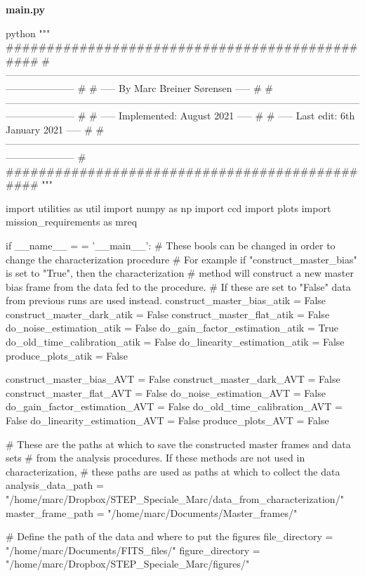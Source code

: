 \documentclass[../main.tex]{subfiles}
\begin{document}
\clearpage
\textbf{main.py}
\begin{mintedbox}{python}
"""
###############################################
# --------------------------------------------------------------------------------------------------------------------------------- #
# -----       By Marc Breiner Sørensen        ----- #
# --------------------------------------------------------------------------------------------------------------------------------- #
# ----- Implemented:           August    2021 ----- #
# ----- Last edit:       6th   January   2021 ----- #
# --------------------------------------------------------------------------------------------------------------------------------- #
###############################################
"""

import utilities as util
import numpy as np
import ccd
import plots
import mission_requirements as mreq

if __name__  =  =  '__main__':
# These bools can be changed in order to change the characterization procedure
# For example  if "construct_master_bias" is set to "True", then the characterization
# method will construct a new master bias frame from the data fed to the procedure.
# If these are set to "False" data from previous runs are used instead.
construct_master_bias_atik  =  False
construct_master_dark_atik  =  False
construct_master_flat_atik  =  False
do_noise_estimation_atik  =  False
do_gain_factor_estimation_atik  =  True
do_old_time_calibration_atik  =  False
do_linearity_estimation_atik  =  False
produce_plots_atik  =  False

construct_master_bias_AVT  =  False
construct_master_dark_AVT  =  False
construct_master_flat_AVT  =  False
do_noise_estimation_AVT  =  False
do_gain_factor_estimation_AVT  =  False
do_old_time_calibration_AVT  =  False
do_linearity_estimation_AVT  =  False
produce_plots_AVT  =  False

# These are the paths at which to save the constructed master frames and data sets
# from the analysis procedures. If these methods are not used in characterization,
# these paths are used as paths at which to collect the data
analysis_data_path  =  "/home/marc/Dropbox/STEP_Speciale_Marc/data_from_characterization/"
master_frame_path  =  "/home/marc/Documents/Master_frames/"

# Define the path of the data and where to put the figures
file_directory  =  "/home/marc/Documents/FITS_files/"
figure_directory  =  "/home/marc/Dropbox/STEP_Speciale_Marc/figures/"


\end{mintedbox}
\end{document}
